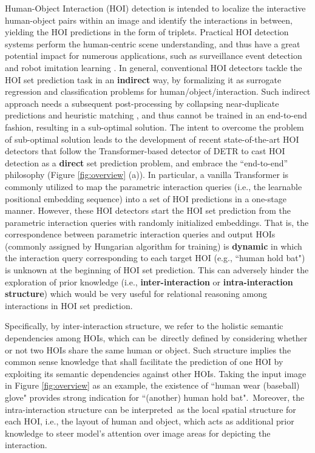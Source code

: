 \documentclass[10pt,twocolumn,letterpaper]{article}
\begin{document}
Human-Object Interaction (HOI) detection \cite{chao2015hico,gupta2015visual} is intended to localize the interactive human-object pairs within an image and identify the interactions in between, yielding the HOI predictions in the form of {\emph{}} triplets. Practical HOI detection systems perform the human-centric scene understanding, and thus have a great potential impact for numerous applications, such as surveillance event detection \cite{adam2008robust,dogariu2020human} and robot imitation learning \cite{argall2009survey}.
In general, conventional HOI detectors \cite{gao2020drg,gao2018ican,gkioxari2018detecting,kim2020uniondet,liu2020amplifying,liao2020ppdm,qi2018learning,wang2020contextual,wang2019deep,wang2020learning} tackle the HOI set prediction task in an \textbf{indirect} way, by formalizing it as surrogate regression and classification problems for human/object/interaction. Such indirect approach needs a subsequent post-processing by collapsing near-duplicate predictions and heuristic matching \cite{kim2020uniondet,liao2020ppdm,wang2020learning}, and thus cannot be trained in an end-to-end fashion, resulting in a sub-optimal solution.
The intent to overcome the problem of sub-optimal solution leads to the development of recent state-of-the-art HOI detectors \cite{chen2021reformulating,kim2021hotr,tamura2021qpic,zou2021end} that follow the Transformer-based detector of DETR \cite{carion2020end} to cast HOI detection as a \textbf{direct} set prediction problem, and embrace the ``end-to-end'' philosophy (Figure \ref{fig:overview} (a)). In particular, a vanilla Transformer is commonly utilized to map the parametric interaction queries (i.e., the learnable positional embedding sequence) into a set of HOI predictions in a one-stage manner.
However, these HOI detectors start the HOI set prediction from the parametric interaction queries with randomly initialized embeddings. That is, the correspondence between parametric interaction queries and output HOIs (commonly assigned by Hungarian algorithm for training) is \textbf{dynamic} in which the interaction query corresponding to each target HOI (e.g., ``human hold bat") is unknown at the beginning of HOI set prediction. This can adversely hinder the exploration of prior knowledge (i.e., \textbf{inter-interaction} or \textbf{intra-interaction structure}) which would be very useful for relational reasoning among interactions in HOI set prediction.

Specifically, by inter-interaction structure, we refer to the holistic semantic dependencies among HOIs, which can be~directly defined by considering whether or not two HOIs share the same human or object. Such structure implies the common sense knowledge that shall facilitate the prediction of one HOI by exploiting its semantic dependencies against other HOIs. Taking the input image in Figure \ref{fig:overview} as an example, the existence of ``human wear (baseball) glove" provides strong indication for ``(another) human hold bat".~Moreover, the intra-interaction structure can be interpreted~as the local spatial structure for each HOI, i.e., the layout of human and object, which acts as additional prior knowledge to steer model's attention over image areas for depicting the interaction.
\end{document}
